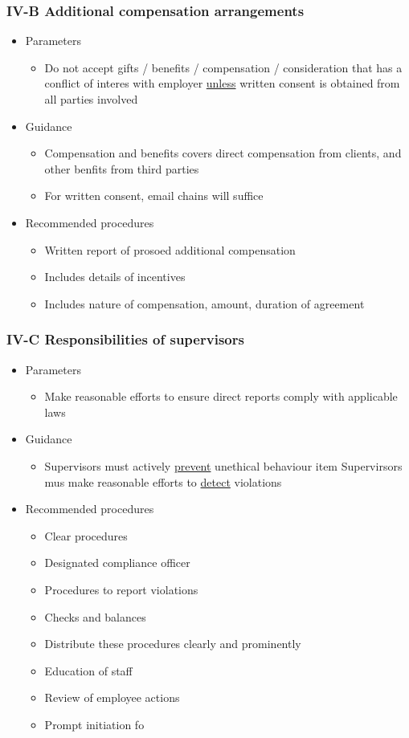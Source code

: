 \documentclass[../notes_compiled.tex]{subfiles}
\begin{document}
\subsubsection{IV-B Additional compensation arrangements}
\begin{itemize}
\item Parameters
\begin{itemize}
\item Do not accept gifts / benefits / compensation / consideration that has a conflict of interes with employer \underline{unless} written consent is obtained from all parties involved
\end{itemize}
\item Guidance
\begin{itemize}
\item Compensation and benefits covers direct compensation from clients, and other benfits from third parties
\item For written consent, email chains will suffice
\end{itemize}
\item Recommended procedures
\begin{itemize}
\item Written report of prosoed additional compensation
\item Includes details of incentives
\item Includes nature of compensation, amount, duration of agreement
\end{itemize}
\end{itemize}
\subsubsection{IV-C Responsibilities of supervisors}
\begin{itemize}
\item Parameters
\begin{itemize}
\item Make reasonable efforts to ensure direct reports comply with applicable laws
\end{itemize}
\item Guidance
\begin{itemize}
\item Supervisors must actively \underline{prevent} unethical behaviour
item Supervirsors mus make reasonable efforts to \underline{detect} violations
\end{itemize}
\item Recommended procedures
\begin{itemize}
\item Clear procedures
\item Designated compliance officer
\item Procedures to report violations
\item Checks and balances
\item Distribute these procedures clearly and prominently
\item Education of staff
\item Review of employee actions
\item Prompt initiation fo 
\end{itemize}
\end{itemize}
\end{document}
